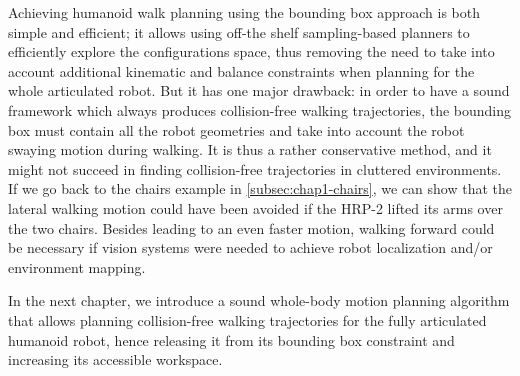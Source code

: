 Achieving humanoid walk planning using the bounding box approach is
both simple and efficient; it allows using off-the shelf
sampling-based planners to efficiently explore the configurations
space, thus removing the need to take into account additional
kinematic and balance constraints when planning for the whole
articulated robot. But it has one major drawback: in order to have a
sound framework which always produces collision-free walking
trajectories, the bounding box must contain all the robot geometries
and take into account the robot swaying motion during walking. It is
thus a rather conservative method, and it might not succeed in finding
collision-free trajectories in cluttered environments. If we go back
to the chairs example in \ref{subsec:chap1-chairs}, we can show that
the lateral walking motion could have been avoided if the HRP-2 lifted
its arms over the two chairs. Besides leading to an even faster
motion, walking forward could be necessary if vision systems were
needed to achieve robot localization and/or environment mapping.

In the next chapter, we introduce a sound whole-body motion planning
algorithm that allows planning collision-free walking trajectories for
the fully articulated humanoid robot, hence releasing it from its
bounding box constraint and increasing its accessible workspace.
